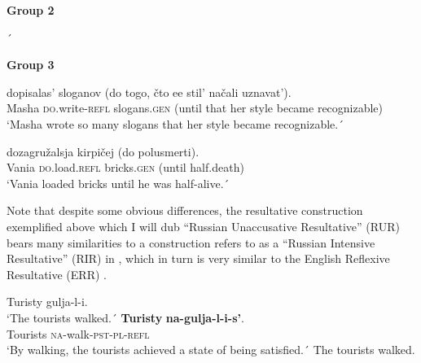 \documentclass[output=paper,colorlinks,citecolor=brown,nonflat]{./langscibook}
\begin{document}
\textbf{Group 2}


´
    \z

    \z

\textbf{Group 3}

\ea%
    \label{ex:antonyuk:33}
       {dopisalas’}            {sloganov}       {(do}     {togo,} {čto} {ee} {stil’} {načali} uznavat’).\\
    Masha \textsc{do}.write-\textsc{refl}  slogans.\textsc{gen}  (until that   her     style became recognizable)\\
    \glt `Masha wrote so many slogans that her style became recognizable.´
    \z

\ea%
    \label{ex:antonyuk:34}
     {dozagružalsja}    {kirpičej}      {(do}    {polusmerti)}.\\
    Vania \textsc{do}.load.\textsc{refl} bricks.\textsc{gen} (until half.death)\\
    \glt `Vania loaded bricks until he was half-alive.´
    \z

Note that despite some obvious differences, the resultative construction exemplified above which I will dub “Russian Unaccusative Resultative” (RUR) bears many similarities to a construction \citet{Tatevosov2010} refers to as a “Russian Intensive Resultative” (RIR) in , which in turn is very similar to the English Reflexive Resultative (ERR) .


\ea%
    \label{ex:antonyuk:35}
    \ea \label{ex:antonyuk:35a}
    {Turisty} {gulja-l-i}.\\
    `The tourists walked.´
    \ex \label{ex:antonyuk:35b}
    \gll \textbf{Turisty} \textbf{na-gulja-l-i-s’}.\\
    Tourists \textsc{na-}walk\textsc{-pst-pl-refl}\\
    \glt `By walking, the tourists achieved a state of being satisfied.´ The tourists walked.
    \z
\z
\end{document}
